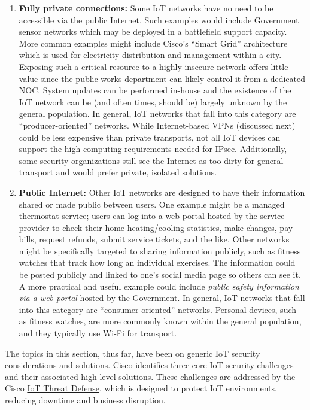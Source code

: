 \begin{enumerate}
  \item	\textbf{Fully private connections:} Some IoT networks have no need
  to be accessible via the public Internet. Such examples would include
  Government sensor networks which may be deployed in a battlefield support
  capacity. More common examples might include Cisco’s ``Smart Grid''
  architecture which is used for electricity distribution and management
  within a city. Exposing such a critical resource to a highly insecure
  network offers little value since the public works department can likely
  control it from a dedicated NOC. System updates can be performed in-house
  and the existence of the IoT network can be (and often times, should be)
  largely unknown by the general population. In general, IoT networks that
  fall into this category are ``producer-oriented'' networks. While
  Internet-based VPNs (discussed next) could be less expensive than private
  transports, not all IoT devices can support the high computing requirements
  needed for IPsec. Additionally, some security organizations still see the
  Internet as too dirty for general transport and would prefer private,
  isolated solutions.
  \item	\textbf{Public Internet:} Other IoT networks are designed to have their
  information shared or made public between users. One example might be a
  managed thermostat service; users can log into a web portal hosted by the
  service provider to check their home heating/cooling statistics, make
  changes, pay bills, request refunds, submit service tickets, and the like.
  Other networks might be specifically targeted to sharing information
  publicly, such as fitness watches that track how long an individual
  exercises. The information could be posted publicly and linked to one’s
  social media page so others can see it. A more practical and useful example
  could include \textit{public safety information via a web portal} hosted by
  the Government. In general, IoT networks that fall into this category are
  ``consumer-oriented'' networks. Personal devices, such as fitness watches,
  are more commonly known within the general population, and they typically
  use Wi-Fi for transport.
\end{enumerate}

The topics in this section, thus far, have been on generic IoT security
considerations and solutions. Cisco identifies three core IoT security
challenges and their associated high-level solutions. These challenges are
addressed by the Cisco
\href{https://www.cisco.com/c/en/us/solutions/security/iot-threat-defense/index.html}{IoT Threat Defense},
which is designed to protect IoT environments, reducing downtime and business disruption.

